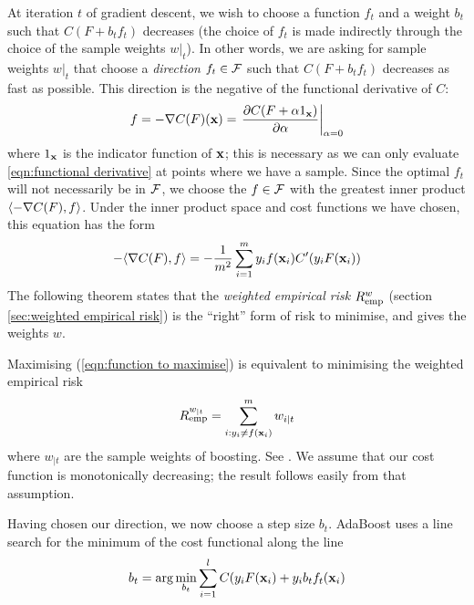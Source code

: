 At iteration $t$ of gradient descent, we wish to choose a function $f_t$ and
a weight $b_t$ such that $C(F + b_t f_t)$ decreases (the choice of
$f_t$ is made indirectly through the choice of the sample weights
$w|_t$).  In other words, we are asking for sample weights $w|_t$ that
choose a \emph{direction} $f_t \in \mathcal{F}$ such that $C(F + b_t f_t)$
decreases as fast as possible.  This direction is the negative of the
functional derivative of $C$:
%
\begin{equation}
f = -\nabla C(F)(\mathbf{x}) = \left. \frac{\partial C(F + \alpha
1_{\mathbf{x}})}{\partial \alpha} \right|_{\alpha = 0}
\label{eqn:functional derivative}
\end{equation}
%
where $1_{\mathbf{x}}$ is the indicator function of $\mathbf{x}$; this is
necessary as we can only evaluate \ref{eqn:functional derivative} at
points where we have a sample.  Since the
optimal $f_t$ will not necessarily be in $\mathcal{F}$, we choose the
$f \in \mathcal{F}$ with the greatest inner product $\langle {-\nabla
C(F)} , {f} \rangle$.  Under the inner product space and cost functions we have
chosen, this equation has the form
%
\begin{equation}
- \langle {\nabla C(F)} , {f} \rangle = - \frac{1}{m^2} \sum_{i=1}^{m} y_i f(\mathbf{x}_i)
  C'(y_i F(\mathbf{x}_i))
\label{eqn:function to maximise}
\end{equation}
%
The following theorem states that the \emph{weighted empirical risk}
$R_{\mathrm{emp}}^{w}$ (section \ref{sec:weighted empirical risk}) is the
``right'' form of risk to minimise, and gives the weights $w$.

\begin{theorem}
Maximising (\ref{eqn:function to maximise}) is equivalent to
minimising the weighted empirical risk
%
\begin{equation}
R_{\mathrm{emp}}^{w_{|t}} = \sum_{i:y_i \neq f(\mathbf{x}_i)}^{m} w_{i|t}
\end{equation}
%
where $w_{|t}$ are the sample weights of boosting.
\proof See \cite{Mason99}.  We assume that our cost function is
monotonically decreasing; the result follows easily from that
assumption.
\end{theorem}

Having chosen our direction, we now choose a step size $b_t$.
AdaBoost uses a line search for the minimum of the cost functional
along the line
%
\begin{equation}
b_t = \arg \min_{b_t} \sum_{i=1}^{l} C(y_i F(\mathbf{x}_i) + y_i b_t f_t(\mathbf{x}_i)
\end{equation}
%

